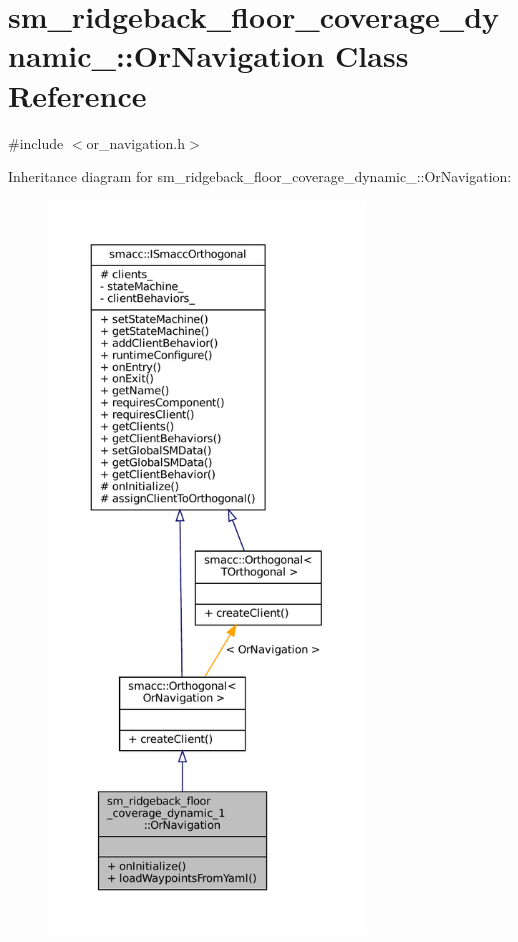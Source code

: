 \hypertarget{classsm__ridgeback__floor__coverage__dynamic__1_1_1OrNavigation}{}\section{sm\+\_\+ridgeback\+\_\+floor\+\_\+coverage\+\_\+dynamic\+\_\+:\+:Or\+Navigation Class Reference}
\label{classsm__ridgeback__floor__coverage__dynamic__1_1_1OrNavigation}


{\ttfamily \#include $<$or\+\_\+navigation.\+h$>$}



Inheritance diagram for sm\+\_\+ridgeback\+\_\+floor\+\_\+coverage\+\_\+dynamic\+\_\+:\+:Or\+Navigation\+:
\nopagebreak
\begin{figure}[H]
\begin{center}
\leavevmode
\includegraphics[height=550pt]{classsm__ridgeback__floor__coverage__dynamic__1_1_1OrNavigation__inherit__graph}
\end{center}
\end{figure}


